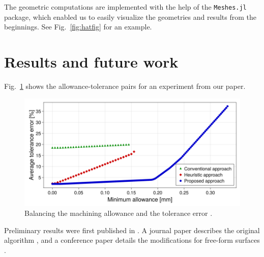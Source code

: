 \documentclass{juliacon}
\begin{document}
The geometric computations are implemented with the help of the \texttt{Meshes.jl} package, which enabled us to easily visualize the geometries and results from the beginnings.
See Fig.~\ref{fig:hatfig} for an example.

\section{Results and future work} %
\label{sec:results}

Fig.~\ref{fig:pareto} shows the allowance-tolerance pairs for an experiment from our paper.

\begin{figure}[b]
	\centerline{\includegraphics[width=0.9\columnwidth]{pareto-new-label.png}}
	\caption{Balancing the machining allowance and the tolerance error \cite{cserteg:2023_Annals}.}
	\label{fig:pareto}
\end{figure}


Preliminary results were first published in \cite{cserteg:2023_DigitalTwinAssisted}.
A journal paper describes the original algorithm \cite{cserteg:2023_Annals}, and a conference paper details the modifications for free-form surfaces \cite{cserteg:2023_CMS}.
\end{document}
